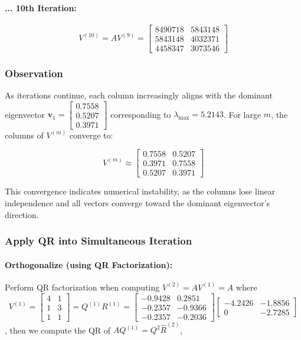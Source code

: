 \documentclass[12pt]{article}
\begin{document}
\paragraph{... 10th Iteration:}

$$
V^{(10)} = A V^{(9)} = \begin{bmatrix} 8490718 & 5843148 \\ 5843148 & 4032371 \\ 4458347 & 3073546 \end{bmatrix}
$$

\subsubsection*{Observation}

As iterations continue, each column increasingly aligns with the dominant eigenvector $\mathbf{v}_1 = \begin{bmatrix} 0.7558 \\ 0.5207 \\ 0.3971 \end{bmatrix}$ corresponding to $\lambda_{\max} = 5.2143$. For large $ m $, the columns of $ V^{(m)} $ converge to:

$$
V^{(m)} \approx \begin{bmatrix} 0.7558 & 0.5207 \\ 0.3971 & 0.7558 \\ 0.5207 & 0.3971 \end{bmatrix}
$$

This convergence indicates numerical instability, as the columns lose linear independence and all vectors converge toward the dominant eigenvector's direction.

\subsubsection*{Apply QR into Simultaneous Iteration}

\paragraph{Orthogonalize (using QR Factorization):}

Perform QR factorization when computing $V^{(2)}= AV^{(1)} = A$ where
$$
V^{(1)} = \begin{bmatrix} 4 & 1 \\ 1 & 3 \\ 1 & 1 \end{bmatrix} =Q^{(1)}R^{(1)}=  \begin{bmatrix}
-0.9428 & 0.2851 \\
-0.2357 & -0.9366 \\
-0.2357 & -0.2036
\end{bmatrix} \begin{bmatrix}
-4.2426 & -1.8856 \\
0 & -2.7285
\end{bmatrix}
$$,
then we compute the QR of $AQ^{(1)} = Q^{2} \hat{R}^{(2)}$,
\end{document}
